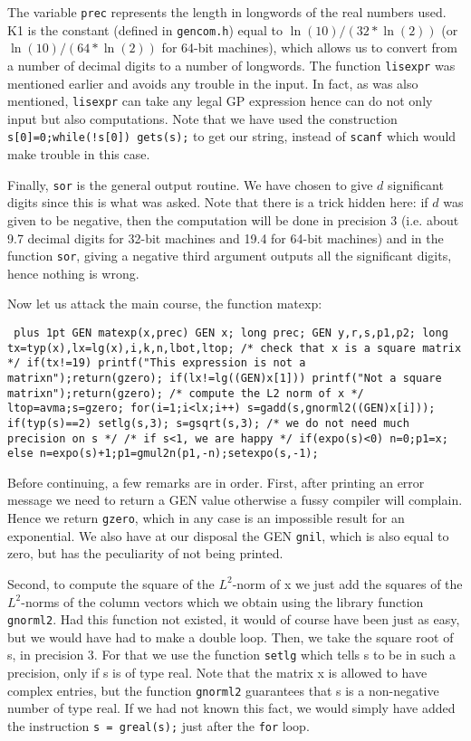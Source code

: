 The variable {\tt prec} represents the length in longwords of the
real numbers used. K1 is the constant (defined in {\tt gencom.h}) equal to
$\ln(10)/(32*\ln(2))$ (or $\ln(10)/(64*\ln(2))$ for 64-bit machines),
which allows us to convert from a number of decimal digits
to a number of longwords. The function {\tt lisexpr} was mentioned earlier and
avoids any trouble in the input. In fact, as was also mentioned, {\tt lisexpr}
can take any legal GP expression hence can do not only input but also
computations. Note that we have used the construction {\tt s[0]=0;while(!s[0]) gets(s);}
to get our string, instead of {\tt scanf} which would make trouble in this case.

Finally, {\tt sor} is the general output routine. We have chosen
to give $d$ significant digits since this is what was asked. Note that there is
a trick hidden here: if $d$ was given to be negative, then the computation will
be done in precision 3 (i.e. about 9.7 decimal digits for 32-bit machines
and 19.4 for 64-bit machines) and in the function
{\tt sor}, giving a negative third argument outputs all the significant digits,
hence nothing is wrong.

Now let us attack the main course, the function matexp:

{\tt \obeylines\parskip=0pt plus 1pt
\hbox{}
GEN matexp(x,prec)
\qquad GEN x;
\qquad long prec;
\hbox{}
\obr
\quad GEN y,r,s,p1,p2;
\quad long tx=typ(x),lx=lg(x),i,k,n,lbot,ltop;
\hbox{}
/* check that x is a square matrix */
\hbox{}
\quad if(tx!=19) \obr printf("This expression is not a matrix\bs n");return(gzero);\cbr 
\quad if(lx!=lg((GEN)x[1])) \obr printf("Not a square matrix\bs n");return(gzero);\cbr 
\hbox{}
/* compute the L2 norm of x */
\hbox{}
\quad ltop=avma;s=gzero;
\quad for(i=1;i<lx;i++) s=gadd(s,gnorml2((GEN)x[i]));
\quad if(typ(s)==2) setlg(s,3);
\quad s=gsqrt(s,3); /* we do not need much precision on s */
\hbox{}
/* if s<1, we are happy */
\hbox{}
\quad if(expo(s)<0) \obr n=0;p1=x;\cbr 
\quad else \obr n=expo(s)+1;p1=gmul2n(p1,-n);setexpo(s,-1);\cbr 
}

Before continuing, a few remarks are in order. First, after printing an error
message we need to return a GEN value otherwise a fussy compiler will complain.
Hence we return {\tt gzero}, which in any case is an impossible result for an
exponential. We also have at our disposal the GEN {\tt gnil}, which is also equal
to zero, but has the peculiarity of not being printed.

Second, to compute the square of the $L^2$-norm of x we just add the
squares of the $L^2$-norms of the column vectors which we obtain using the
library function {\tt gnorml2}. Had this function not existed, it would
of course have been just as easy, but we would have had to make a double loop.
Then, we take the square root of s, in precision 3. For that we use the function
{\tt setlg} which tells s to be in such a precision, only if s is of type real.
Note that the matrix x is allowed to have complex entries, but the function
{\tt gnorml2} guarantees that s is a non-negative number of type real.
If we had not known this fact, we would simply have added
the instruction {\tt s = greal(s);} just after the {\tt for} loop.

